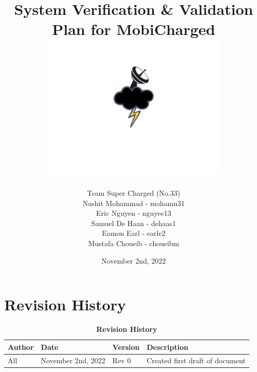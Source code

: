 \documentclass[12pt, titlepage]{article}
\begin{document}
\title{
    System Verification \& Validation Plan for MobiCharged\\
    \includegraphics[width=9cm]{images/mobicharged.png} 
}
\author{Team Super Charged (No.33)
		\\ Nashit Mohammad - mohamn31
		\\ Eric Nguyen - nguyee13
		\\ Samuel De Haan - dehaas1
		\\ Eamon Earl - earle2
		\\ Mustafa Choueib - choueibm
}
    

\date{November 2nd, 2022}


\maketitle

\tableofcontents
\listoffigures
\listoftables

\vspace{20pt}


\newpage


\section{Revision History}
\begin{center}
\begin{table}[H]
\caption{\bf Revision History}
    \begin{tabular}{p{2cm}p{3cm}p{2cm}p{6cm}}
    \hline
    \bf Author & \bf Date & \bf Version & \bf Description\\
    \hline
    All & November 2nd, 2022 & Rev 0 & Created first draft of document\\
    \hline
    \end{tabular}
\end{table}
\end{center}
\end{document}
